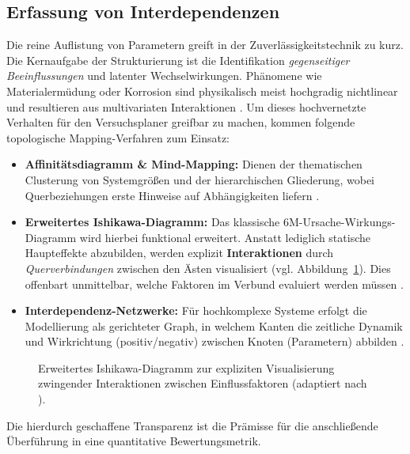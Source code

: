 \subsection{Erfassung von Interdependenzen} \label{subsec:Strukturierungsmethoden}

Die reine Auflistung von Parametern greift in der Zuverlässigkeitstechnik zu kurz.
Die Kernaufgabe der Strukturierung ist die Identifikation \textit{gegenseitiger Beeinflussungen} und latenter Wechselwirkungen.
Phänomene wie Materialermüdung oder Korrosion sind physikalisch meist hochgradig nichtlinear und resultieren aus multivariaten Interaktionen \cite{Montgomery.2020,Kremer.2021,Arndt.2023c}.
Um dieses hochvernetzte Verhalten für den Versuchsplaner greifbar zu machen, kommen folgende topologische Mapping-Verfahren zum Einsatz:
\begin{itemize}
    \item \textbf{Affinitätsdiagramm \& Mind-Mapping:} Dienen der thematischen Clusterung von Systemgrößen und der hierarchischen Gliederung, wobei Querbeziehungen erste Hinweise auf Abhängigkeiten liefern \cite{Bruckner.2019,Buzan.2010}.
    \item \textbf{Erweitertes Ishikawa-Diagramm:} Das klassische 6M-Ur\-sa\-che-Wirk\-ungs-Di\-a\-gramm wird hierbei funktional erweitert.
          Anstatt lediglich statische Haupteffekte abzubilden, werden explizit \textbf{Interaktionen} durch \textit{Querverbindungen} zwischen den Ästen visualisiert (vgl. Abbildung~\ref{fig:ishikawa_interactions}).
          Dies offenbart unmittelbar, welche Faktoren im Verbund evaluiert werden müssen \cite{Arndt.2022,Daenzer.2002}.
    \item \textbf{Interdependenz-Netzwerke:} Für hochkomplexe Systeme erfolgt die Modellierung als gerichteter Graph, in welchem Kanten die zeitliche Dynamik und Wirkrichtung (positiv/negativ) zwischen Knoten (Parametern) abbilden \cite{Tittmann.2019}.
\end{itemize}

\begin{figure}[htbp]
    \centering
    \def\svgwidth{0.95\textwidth}
    
    \caption{Erweitertes Ishikawa-Diagramm zur expliziten Visualisierung zwingender Interaktionen zwischen Einflussfaktoren (adaptiert nach \cite{Arndt.2022}).}
    \label{fig:ishikawa_interactions}
\end{figure}

Die hierdurch geschaffene Transparenz ist die Prämisse für die anschließende Überführung in eine quantitative Bewertungsmetrik.

